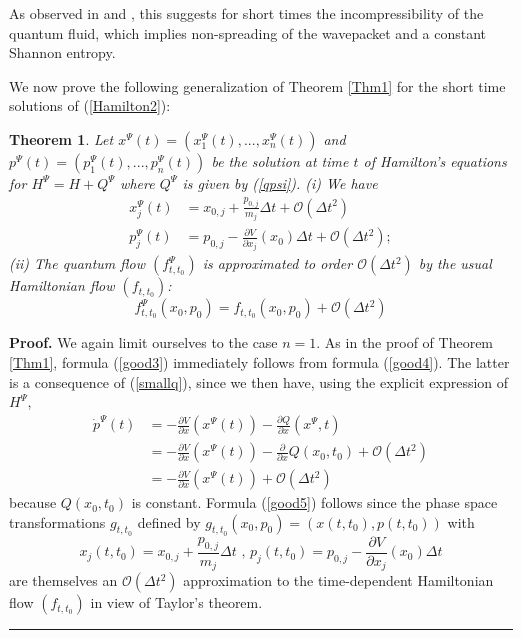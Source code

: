 \documentclass[12pt]{article}%
\newtheorem{theorem}{Theorem}
\newenvironment{proof}[1][Proof]{\noindent\textbf{#1.} }{\ \rule{0.5em}{0.5em}}
\begin{document}
As observed in \cite{heco16} and \cite{MMadelung}, this suggests for short
times the incompressibility of the quantum fluid, which implies non-spreading
of the wavepacket and a constant Shannon entropy.

We now prove the following generalization of Theorem \ref{Thm1} for the short
time solutions of (\ref{Hamilton2}):

\begin{theorem}
\label{Thm3}Let $x^{\Psi}(t)=(x_{1}^{\Psi}(t),...,x_{n}^{\Psi}(t))$ and
$p^{\Psi}(t)=(p_{1}^{\Psi}(t),...,p_{n}^{\Psi}(t))$ be the solution at time
$t$ of Hamilton's equations for $H^{\Psi}=H+Q^{\Psi}$ where $Q^{\Psi} $ is
given by (\ref{qpsi}). (i) We have
\begin{align}
x_{j}^{\Psi}(t)  &  =x_{0,j}+\frac{p_{0,j}}{m_{j}}\Delta t+\mathcal{O}(\Delta
t^{2})\label{good3}\\
p_{j}^{\Psi}(t)  &  =p_{0,j}-\frac{\partial V}{\partial x_{j}}(x_{0})\Delta
t+\mathcal{O}(\Delta t^{2}); \label{good4}%
\end{align}
(ii) The quantum flow $(f_{t,t_{0}}^{\Psi})$ is approximated to order
$\mathcal{O}(\Delta t^{2})$ by the usual Hamiltonian flow $(f_{t,t_{0}})$:%
\begin{equation}
f_{t,t_{0}}^{\Psi}(x_{0},p_{0})=f_{t,t_{0}}(x_{0},p_{0})+\mathcal{O}(\Delta
t^{2}) \label{good5}%
\end{equation}

\end{theorem}

\begin{proof}
We again limit ourselves to the case $n=1$. As in the proof of Theorem
\ref{Thm1}, formula (\ref{good3}) immediately follows from formula
(\ref{good4}). The latter is a consequence of (\ref{smallq}), since we then
have, using the explicit expression of $H^{\Psi}$,
\begin{align*}
\dot{p}^{\Psi}(t)  &  =-\frac{\partial V}{\partial x}(x^{\Psi}(t))-\frac
{\partial Q}{\partial x}(x^{\Psi},t)\\
&  =-\frac{\partial V}{\partial x}(x^{\Psi}(t))-\frac{\partial}{\partial
x}Q(x_{0},t_{0})+\mathcal{O}(\Delta t^{2})\\
&  =-\frac{\partial V}{\partial x}(x^{\Psi}(t))+\mathcal{O}(\Delta t^{2})
\end{align*}
because $Q(x_{0},t_{0})$ is constant. Formula (\ref{good5}) follows since the
phase space transformations $g_{t,t_{0}}$ defined by $g_{t,t_{0}}(x_{0}%
,p_{0})=(x(t,t_{0}),p(t,t_{0}))$ with
\[
x_{j}(t,t_{0})=x_{0,j}+\frac{p_{0,j}}{m_{j}}\Delta t\text{ \ , \ }%
p_{j}(t,t_{0})=p_{0,j}-\frac{\partial V}{\partial x_{j}}(x_{0})\Delta t
\]
are themselves an $\mathcal{O}(\Delta t^{2})$ approximation to the
time-dependent Hamiltonian flow $(f_{t,t_{0}})$ in view of Taylor's theorem.
\end{proof}
\end{document}
